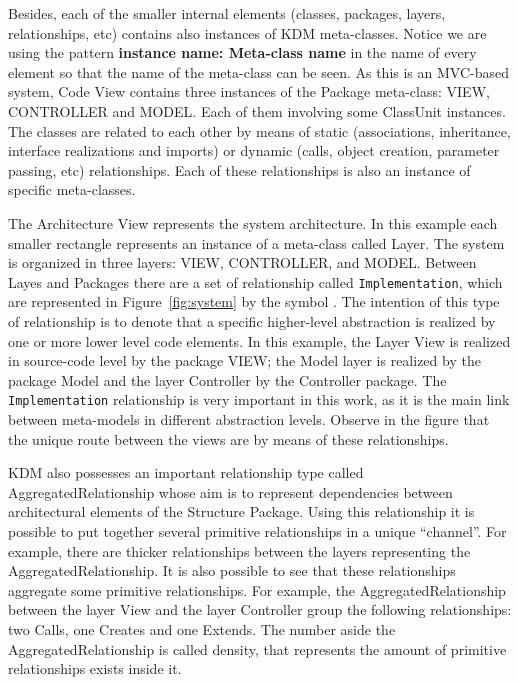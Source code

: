 Besides, each of the smaller internal elements (classes, packages, layers, relationships, etc) contains also instances of KDM meta-classes. Notice we are using the pattern \textbf{instance name: Meta-class name} in the name of every element so that the name of the meta-class can be seen. As this is an MVC-based system, Code View contains three instances of the Package meta-class: VIEW, CONTROLLER and MODEL. Each of them involving some ClassUnit instances. The classes are related to each other by means of static (associations, inheritance, interface realizations and imports) or dynamic (calls, object creation, parameter passing, etc) relationships. Each of these relationships is also an instance of specific meta-classes. 

The Architecture View represents the system architecture. In this example each smaller rectangle represents an instance of a meta-class called Layer. The system is organized in three layers:  VIEW, CONTROLLER, and MODEL. Between Layes and Packages there are a set of relationship called \texttt{Implementation}, which are represented in Figure~\ref{fig:system} by the symbol \foobarMeu. The intention of this type of relationship is to denote that a specific higher-level abstraction is realized by one or more lower level code elements. In this example, the Layer View is realized in source-code level by the package VIEW; the Model layer is realized by the package Model and the layer Controller by the Controller package. The \texttt{Implementation} relationship is very important in this work, as it is the main link between meta-models in different abstraction levels. Observe in the figure that the unique route between the views are by means of these relationships.

KDM also possesses an important relationship type called AggregatedRelationship whose aim is to represent dependencies between architectural elements of the Structure Package. Using this relationship it is possible to put together several primitive relationships in a unique ``channel''. For example, there are thicker relationships between the layers representing the AggregatedRelationship. It is also possible to see that these relationships aggregate some primitive relationships. For example, the AggregatedRelationship between the layer View and the layer Controller group the following relationships: two Calls, one Creates and one Extends. The number aside the AggregatedRelationship is called density, that represents the amount of primitive relationships exists inside it.

